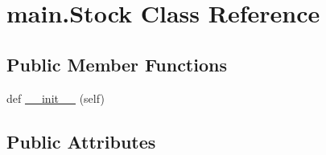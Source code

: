 \hypertarget{classmain_1_1_stock}{}\section{main.\+Stock Class Reference}
\label{classmain_1_1_stock}
\subsection*{Public Member Functions}
\begin{DoxyCompactItemize}
\item 
def \hyperlink{classmain_1_1_stock_a1cd2ba9c4d91a1b8c27d307fdeef470a}{\+\_\+\+\_\+init\+\_\+\+\_\+} (self)
\end{DoxyCompactItemize}
\subsection*{Public Attributes}
